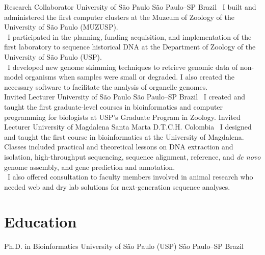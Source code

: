 \documentclass[11pt, letterpaper, sans]{moderncv}
\begin{document}
%
{Research Collaborator}
{University of São Paulo}
{São Paulo--SP}
{Brazil}
{
\textbullet~I built and administered the first computer clusters at the Muzeum of Zoology of the University of São Paulo (MUZUSP).\\ %
\textbullet~I participated in the planning, funding acquisition, and implementation of the first laboratory to sequence historical DNA at the Department of Zoology of the University of São Paulo (USP).\\ %
\textbullet~I developed new genome skimming techniques to retrieve genomic data of non-model organisms when samples were small or degraded. I also created the necessary software to facilitate the analysis of organelle genomes.\\ %
}
%
{Invited Lecturer}
{University of São Paulo}
{São Paulo--SP}
{Brazil}
{
\textbullet~I created and taught the first graduate-level courses in bioinformatics and computer programming for biologists at USP's Graduate Program in Zoology. %
}
%
{Invited Lecturer}
{University of Magdalena}
{Santa Marta D.T.C.H.}
{Colombia}
{
\textbullet~I designed and taught the first course in bioinformatics at the University of Magdalena. Classes included practical and theoretical lessons on DNA extraction and isolation, high-throughput sequencing, sequence alignment, reference, and \textit{de novo} genome assembly, and gene prediction and annotation.\\
\textbullet~I also offered consultation to faculty members involved in animal research who needed web and dry lab solutions for next-generation sequence analyses.
}


\vspace{-1em}

\section{Education}

{Ph.D. in Bioinformatics}
{University of São Paulo (USP)}
{São Paulo--SP}
{Brazil}
{}
\end{document}
